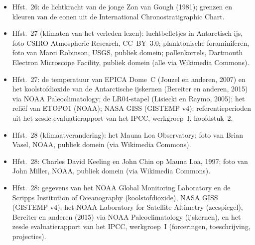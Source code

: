 \begin{itemize}
  \item Hfst.~26: de lichtkracht van de jonge Zon van Gough (1981); grenzen en kleuren van de eonen uit de International Chronostratigraphic Chart.
  \item Hfst.~27 (klimaten van het verleden lezen): luchtbelletjes in Antarctisch ijs, foto CSIRO Atmospheric Research, CC~BY~3.0; planktonische foraminiferen, foto van Marci Robinson, USGS, publiek domein; pollenkorrels, Dartmouth Electron Microscope Facility, publiek domein (alle via Wikimedia Commons).
  \item Hfst.~27: de temperatuur van EPICA Dome~C (Jouzel en anderen, 2007) en het koolstofdioxide van de Antarctische ijskernen (Bereiter en anderen, 2015) via NOAA Paleoclimatology; de LR04-stapel (Lisiecki en Raymo, 2005); het reliëf van ETOPO1 (NOAA); NASA GISS (GISTEMP v4); referentieperioden uit het zesde evaluatierapport van het IPCC, werkgroep~I, hoofdstuk~2.
  \item Hfst.~28 (klimaatverandering): het Mauna Loa Observatory; foto van Brian Vasel, NOAA, publiek domein (via Wikimedia Commons).
  \item Hfst.~28: Charles David Keeling en John Chin op Mauna Loa, 1997; foto van John Miller, NOAA, publiek domein (via Wikimedia Commons).
  \item Hfst.~28: gegevens van het NOAA Global Monitoring Laboratory en de Scripps Institution of Oceanography (koolstofdioxide), NASA GISS (GISTEMP v4), het NOAA Laboratory for Satellite Altimetry (zeespiegel), Bereiter en anderen (2015) via NOAA Paleoclimatology (ijskernen), en het zesde evaluatierapport van het IPCC, werkgroep~I (forceringen, toeschrijving, projecties).
\end{itemize}
